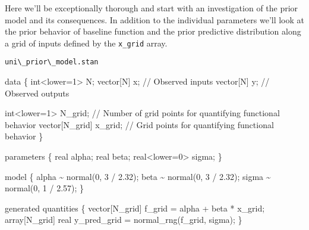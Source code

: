 \documentclass[
  letterpaper,
  DIV=11,
  numbers=noendperiod]{scrartcl}
\newenvironment{Shaded}{\begin{snugshade}}{\end{snugshade}}
\newcommand{\CommentTok}[1]{\textcolor[rgb]{0.37,0.37,0.37}{#1}}
\newcommand{\DataTypeTok}[1]{\textcolor[rgb]{0.68,0.00,0.00}{#1}}
\newcommand{\DecValTok}[1]{\textcolor[rgb]{0.68,0.00,0.00}{#1}}
\newcommand{\FloatTok}[1]{\textcolor[rgb]{0.68,0.00,0.00}{#1}}
\newcommand{\KeywordTok}[1]{\textcolor[rgb]{0.00,0.23,0.31}{#1}}
\newcommand{\NormalTok}[1]{\textcolor[rgb]{0.00,0.23,0.31}{#1}}
\begin{document}
Here we'll be exceptionally thorough and start with an investigation of
the prior model and its consequences. In addition to the individual
parameters we'll look at the prior behavior of baseline function and the
prior predictive distribution along a grid of inputs defined by the
\texttt{x\_grid} array.

\begin{codelisting}

\caption{\texttt{uni\textbackslash\_prior\textbackslash\_model.stan}}

\begin{Shaded}
\begin{Highlighting}[]
\KeywordTok{data}\NormalTok{ \{}
  \DataTypeTok{int}\NormalTok{\textless{}}\KeywordTok{lower}\NormalTok{=}\DecValTok{1}\NormalTok{\textgreater{} N;}
  \DataTypeTok{vector}\NormalTok{[N] x; }\CommentTok{// Observed inputs}
  \DataTypeTok{vector}\NormalTok{[N] y; }\CommentTok{// Observed outputs}

  \DataTypeTok{int}\NormalTok{\textless{}}\KeywordTok{lower}\NormalTok{=}\DecValTok{1}\NormalTok{\textgreater{} N\_grid; }\CommentTok{// Number of grid points for quantifying functional behavior}
  \DataTypeTok{vector}\NormalTok{[N\_grid] x\_grid; }\CommentTok{// Grid points for quantifying functional behavior}
\NormalTok{\}}

\KeywordTok{parameters}\NormalTok{ \{}
  \DataTypeTok{real}\NormalTok{ alpha;}
  \DataTypeTok{real}\NormalTok{ beta;}
  \DataTypeTok{real}\NormalTok{\textless{}}\KeywordTok{lower}\NormalTok{=}\DecValTok{0}\NormalTok{\textgreater{} sigma;}
\NormalTok{\}}

\KeywordTok{model}\NormalTok{ \{}
\NormalTok{  alpha \textasciitilde{} normal(}\DecValTok{0}\NormalTok{, }\DecValTok{3}\NormalTok{ / }\FloatTok{2.32}\NormalTok{);}
\NormalTok{  beta \textasciitilde{} normal(}\DecValTok{0}\NormalTok{, }\DecValTok{3}\NormalTok{ / }\FloatTok{2.32}\NormalTok{);}
\NormalTok{  sigma \textasciitilde{} normal(}\DecValTok{0}\NormalTok{, }\DecValTok{1}\NormalTok{ / }\FloatTok{2.57}\NormalTok{);}
\NormalTok{\}}

\KeywordTok{generated quantities}\NormalTok{ \{}
  \DataTypeTok{vector}\NormalTok{[N\_grid] f\_grid = alpha + beta * x\_grid;}
  \DataTypeTok{array}\NormalTok{[N\_grid] }\DataTypeTok{real}\NormalTok{ y\_pred\_grid = normal\_rng(f\_grid, sigma);}
\NormalTok{\}}
\end{Highlighting}
\end{Shaded}

\end{codelisting}
\end{document}
